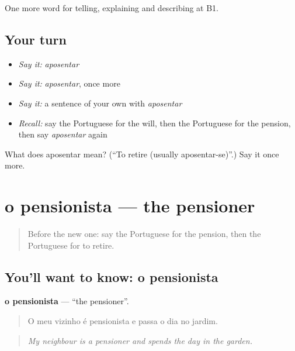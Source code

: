 \begin{grammarlens}[title={What you've built}]
One more word for telling, explaining and describing at B1.
\end{grammarlens}

\subsection*{Your turn}
\begin{itemize}
\raggedright
  \item \emph{Say it:} \emph{aposentar}
  \item \emph{Say it:} \emph{aposentar}, once more
  \item \emph{Say it:} a sentence of your own with \emph{aposentar}
  \item \emph{Recall:} say the Portuguese for the will, then the Portuguese for the pension, then say \emph{aposentar} again
\end{itemize}

\begin{tcolorbox}[breakable,colback=teal!4,colframe=teal!35!black,title={Before you move on}]
What does aposentar mean? (\textquotedblleft{}To retire (usually aposentar-se)\textquotedblright{}.) Say it once more.
\end{tcolorbox}
\section[o pensionista]{o pensionista — the pensioner}

\label{lesson:PT-C317-pensionista}



\begin{quote}
Before the new one: say the Portuguese for the pension, then the Portuguese for to retire.
\end{quote}

\subsection*{You'll want to know: o pensionista}
\textbf{o pensionista} — \textquotedblleft{}the pensioner\textquotedblright{}.

\begin{quote}
O meu vizinho é pensionista e passa o dia no jardim.
\end{quote}

\begin{quote}
\emph{My neighbour is a pensioner and spends the day in the garden.}
\end{quote}

